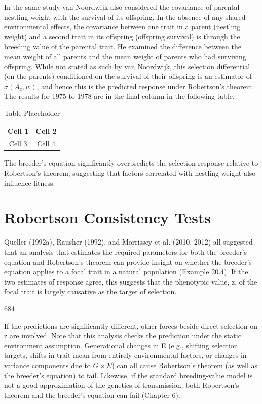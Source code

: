 \documentclass{article}
\begin{document}
In the same study van Noordwijk also considered the covariance of parental nestling weight with the survival of its offspring. In the absence of any shared environmental effects, the covariance between one trait in a parent (nestling weight) and a second trait in its offspring (offspring survival) is through the breeding value of the parental trait. He examined the difference between the mean weight of all parents and the mean weight of parents who had surviving offspring. While not stated as such by van Noordwijk, this selection differential (on the parents) conditioned on the survival of their offspring is an estimator of  $ \sigma(A_{z}, w) $, and hence this is the predicted response under Robertson's theorem. The results for 1975 to 1978 are in the final column in the following table.

\begin{table}[h]
\centering
\begin{tabular}{|c|c|}
\hline
Cell 1 & Cell 2 \\
\hline
Cell 3 & Cell 4 \\
\hline
\end{tabular}
\caption{Table Placeholder}
\end{table}

The breeder’s equation significantly overpredicts the selection response relative to Robertson’s theorem, suggesting that factors correlated with nestling weight also influence fitness.

\section{Robertson Consistency Tests}
Queller (1992a), Rausher (1992), and Morrissey et al. (2010, 2012) all suggested that an analysis that estimates the required parameters for both the breeder's equation and Robertson's theorem can provide insight on whether the breeder's equation applies to a focal trait in a natural population (Example 20.4). If the two estimates of response agree, this suggests that the phenotypic value, z, of the focal trait is largely causative as the target of selection.

684

If the predictions are significantly different, other forces beside direct selection on z are involved. Note that this analysis checks the prediction under the static environment assumption. Generational changes in E (e.g., shifting selection targets, shifts in trait mean from entirely environmental factors, or changes in variance components due to  $ G \times E $) can all cause Robertson's theorem (as well as the breeder's equation) to fail. Likewise, if the standard breeding-value model is not a good approximation of the genetics of transmission, both Robertson's theorem and the breeder's equation can fail (Chapter 6).
\end{document}
